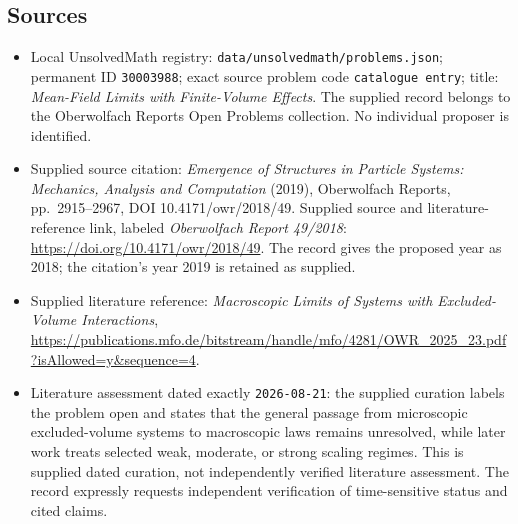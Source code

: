 \documentclass[11pt]{article}
\begin{document}
\subsection{Sources}
\begin{itemize}
\item Local UnsolvedMath registry: \texttt{data/unsolvedmath/problems.json}; permanent ID \texttt{30003988}; exact source problem code \texttt{catalogue entry}; title: \emph{Mean-Field Limits with Finite-Volume Effects}. The supplied record belongs to the Oberwolfach Reports Open Problems collection. No individual proposer is identified.
\item Supplied source citation: \emph{Emergence of Structures in Particle Systems: Mechanics, Analysis and Computation} (2019), Oberwolfach Reports, pp.~2915--2967, DOI 10.4171/owr/2018/49. Supplied source and literature-reference link, labeled \emph{Oberwolfach Report 49/2018}: \url{https://doi.org/10.4171/owr/2018/49}. The record gives the proposed year as 2018; the citation's year 2019 is retained as supplied.
\item Supplied literature reference: \emph{Macroscopic Limits of Systems with Excluded-Volume Interactions}, \url{https://publications.mfo.de/bitstream/handle/mfo/4281/OWR_2025_23.pdf?isAllowed=y&sequence=4}.
\item Literature assessment dated exactly \texttt{2026-08-21}: the supplied curation labels the problem open and states that the general passage from microscopic excluded-volume systems to macroscopic laws remains unresolved, while later work treats selected weak, moderate, or strong scaling regimes. This is supplied dated curation, not independently verified literature assessment. The record expressly requests independent verification of time-sensitive status and cited claims.
\end{itemize}
\end{document}
